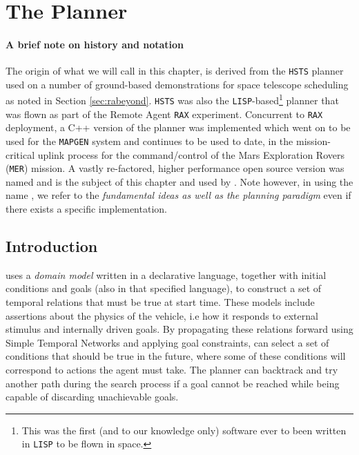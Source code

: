 \section{The \eu Planner }
\label{sec:basics}

\paragraph {A brief note on \eu history and notation} The origin of
what we will call \eu in this chapter, is derived from the
\texttt{HSTS} planner \cite{mus94} used on a number of ground-based
demonstrations for space telescope scheduling as noted in Section
\ref{sec:rabeyond}. \texttt{HSTS} was also the
\texttt{LISP}-based\footnote{This was the first (and to our knowledge
  only) software ever to been written in \texttt{LISP} to be flown in
  space.} planner that was flown as part of the Remote Agent
\texttt{RAX} experiment. Concurrent to \texttt{RAX} deployment, a C++
version of the planner was implemented which went on to be used for
the \texttt{MAPGEN} \cite{bresina05} system and continues to be used
to date, in the mission-critical uplink process for the
command/control of the Mars Exploration Rovers (\texttt{MER})
mission. A vastly re-factored, higher performance open source version
\cite{europapso} was named \eut and is the subject of this chapter and
used by \rxe.  Note however, in using the name \eu, we refer to the
\emph{fundamental ideas as well as the planning paradigm} even if
there exists a specific implementation.

\subsection{Introduction}
\label{sec:euintro}

\eu uses a \emph{domain model} written in a declarative language,
together with initial conditions and goals (also in that specified
language), to construct a set of temporal relations that must be true
at start time. These models include assertions about the physics of
the vehicle, i.e how it responds to external stimulus and internally
driven goals. By propagating these relations forward using Simple
Temporal Networks \cite{dechter91} and applying goal constraints, \eu
can select a set of conditions that should be true in the future,
where some of these conditions will correspond to actions the agent
must take. The planner can backtrack and try another path during the
search process if a goal cannot be reached while being capable of
discarding unachievable goals.


